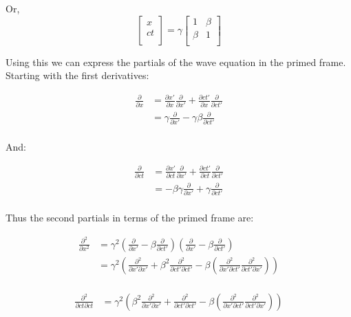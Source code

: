 Or,
\begin{equation*}
\begin{bmatrix}
x \\
c t \\
\end{bmatrix}
=
\gamma
\begin{bmatrix}
1 & \beta \\
\beta & 1 \\
\end{bmatrix}
\end{equation*}

Using this we can express the partials of the wave equation in the
primed frame.  Starting with the first derivatives:

\begin{align*}
\frac{\partial}{\partial x}
&= \frac{\partial x'}{\partial x} \frac{\partial}{\partial x'} + \frac{\partial c t'}{\partial x} \frac{\partial}{\partial c t'} \\
&= \gamma \frac{\partial}{\partial x'} - \gamma \beta \frac{\partial}{\partial c t'} \\
\end{align*}

And:

\begin{align*}
\frac{\partial}{\partial ct}
&= \frac{\partial x'}{\partial ct} \frac{\partial}{\partial x'} + \frac{\partial c t'}{\partial ct} \frac{\partial}{\partial c t'} \\
&= -\beta \gamma \frac{\partial}{\partial x'} + \gamma \frac{\partial}{\partial c t'} \\
\end{align*}

Thus the second partials in terms of the primed frame are:

\begin{align*}
\frac{\partial^2}{\partial x^2}
&= \gamma^2
\left(\frac{\partial}{\partial x'} - \beta \frac{\partial}{\partial c t'} \right)
\left(\frac{\partial}{\partial x'} - \beta \frac{\partial}{\partial c t'} \right)
\\
&= \gamma^2
\left(
\frac{\partial^2}{\partial x'\partial x'} + \beta^2 \frac{\partial^2}{\partial c t'\partial c t'}
- \beta \left(
\frac{\partial^2}{\partial x' \partial c t'}
\frac{\partial^2}{\partial c t' \partial x'}
\right)
\right)
\\
\end{align*}

\begin{align*}
\frac{\partial^2}{\partial ct \partial ct}
&= \gamma^2
\left(
\beta^2 \frac{\partial^2}{\partial x'\partial x'} + \frac{\partial^2}{\partial c t'\partial c t'}
- \beta \left(
\frac{\partial^2}{\partial x' \partial c t'}
\frac{\partial^2}{\partial c t' \partial x'}
\right)
\right)
\\
\end{align*}

